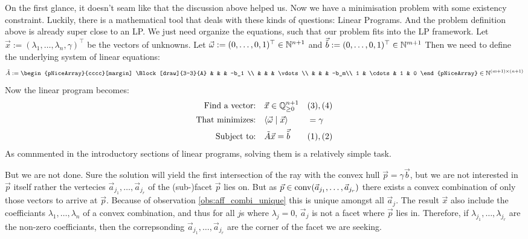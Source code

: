 On the first glance, it doesn't seam like that the discussion above helped us. Now we have a minimisation problem with some existency constraint. Luckily, there is a mathematical tool that deals with these kinds of questions: Linear Programs. And the problem definition above is already super close to an LP. We just need organize the equations, such that our problem fits into the LP framework. Let $\vec x := (\lambda_1, \dots, \lambda_n, \gamma)^\top$ be the vectors of unknowns. Let $\vec\omega := (0, \dots, 0, 1)^\top \in \mathbb{N}^{n+1}$ and $\vec{\tilde b} := (0, \dots, 0, 1)^\top \in \mathbb{N}^{m+1}$ Then we need to define the underlying system of linear equations:
$$\tilde A :=
\begin{pNiceArray}{cccc}[margin] 
\Block[draw]{3-3}{A} & & & -b_1 \\
& & & \vdots\\
& & & -b_m\\
1 & \cdots  & 1 & 0 
\end{pNiceArray} \in \N^{(m+1) \times (n+1)}$$
Now the linear program becomes:
\begin{align*}
    \text{Find a vector:} & \quad \vec x \in \mathbb{Q}^{n+1}_{\geq 0} &&(3), (4)\\
    \text{That minimizes:} & \quad \langle \vec \omega \mid \vec x \rangle &&=\gamma\\
    \text{Subject to:} & \quad \tilde A\vec x = \vec{\tilde b} &&(1), (2)
\end{align*}
As comnmented in the introductory sections of linear programs, solving them is a relatively simple task.

But we are not done. Sure the solution will yield the first intersection of the ray with the convex hull $\vec p = \gamma\vec b$, but we are not interested in $\vec p$ itself rather the vertecies $\vec a_{j_1}, \dots, \vec a_{j_r}$ of the (sub-)facet $\vec p$ lies on. But as $\vec p \in \operatorname{conv}(\vec a_{j_1}, \dots, \vec a_{j_r})$ there exists a convex combination of only those vectors to arrive at $\vec p$. Because of observation \ref{obs:aff_combi_unique} this is unique amongst all $\vec a_j$. The result $\vec x$ also include the coefficiants $\lambda_1, \dots, \lambda_n$ of a convex combination, and thus for all $j$s where $\lambda_j = 0$, $\vec a_j$ is not a facet where $\vec p$ lies in. Therefore, if $\lambda_{j_1}, \dots, \lambda_{j_r}$ are the non-zero coefficiants, then the correpsonding $\vec a_{j_1}, \dots, \vec a_{j_r}$ are the corner of the facet we are seeking.

